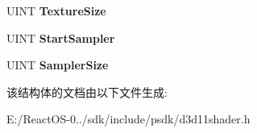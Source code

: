 \begin{DoxyCompactItemize}
\item 
\mbox{\label{struct___d3_d11___s_h_a_d_e_r___v_a_r_i_a_b_l_e___d_e_s_c_a9c85b2b77d1d932841b1881383720a66}} 
U\+I\+NT {\bfseries Texture\+Size}
\item 
\mbox{\label{struct___d3_d11___s_h_a_d_e_r___v_a_r_i_a_b_l_e___d_e_s_c_a917293319a02e206889870d280744849}} 
U\+I\+NT {\bfseries Start\+Sampler}
\item 
\mbox{\label{struct___d3_d11___s_h_a_d_e_r___v_a_r_i_a_b_l_e___d_e_s_c_a700272f6b37b312f6c9fb8af906f9187}} 
U\+I\+NT {\bfseries Sampler\+Size}
\end{DoxyCompactItemize}


该结构体的文档由以下文件生成\+:\begin{DoxyCompactItemize}
\item 
E\+:/\+React\+O\+S-\/0../sdk/include/psdk/d3d11shader.\+h\end{DoxyCompactItemize}
